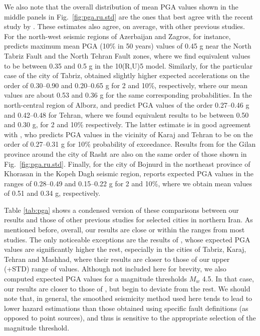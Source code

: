 We also note that the overall distribution of mean PGA values shown in the middle panels in Fig.~\ref{fig:pga.ru.std} are the ones that best agree with the recent study by \citet{Khodaverdian_2016_BSSA}. These estimates also agree, on average, with other previous studies. For the north-west seismic regions of Azerbaijan and Zagros, for instance, \citet{Tavakoli1999} predicts maximum mean PGA (10\% in 50 years) values of 0.45 g near the North Tabriz Fault and the North Tehran Fault zones, where we find equivalent values to be between 0.35 and 0.5 g in the 10(R,U)5 model. Similarly, for the particular case of the city of Tabriz, \citet{Vafaie2011} obtained slightly higher expected accelerations on the order of 0.30--0.90 and 0.20--0.65 g for 2 and 10\%, respectively, where our mean values are about 0.53 and 0.36 g for the same corresponding probabilities. In the north-central region of Alborz, \citet{Ghodrati2003} and \citet{Boostan2015} predict PGA values of the order 0.27--0.46 g and 0.42--0.48 for Tehran, where we found equivalent results to be between 0.50 and 0.30 g, for 2 and 10\% respectively. The latter estimate is in good agreement with \citet{Abdi2013}, who predicts PGA values in the vicinity of Karaj and Tehran to be on the order of 0.27--0.31 g for 10\% probability of exceedance. Results from \citet{Ghodrati2008} for the Gilan province around the city of Rasht are also on the same order of those shown in Fig.~\ref{fig:pga.ru.std}. Finally, for the city of Bojnurd in the northeast province of Khorasan in the Kopeh Dagh seismic region, \citet{Rahgozar2012} reports expected PGA values in the ranges of 0.28--0.49 and 0.15--0.22 g for 2 and 10\%, where we obtain mean values of 0.51 and 0.34 g, respectively.

Table \ref{tab:pga} shows a condensed version of these comparisons between our results and those of other previous studies for selected cities in northern Iran. As mentioned before, overall, our results are close or within the ranges from most studies. The only noticeable exceptions are the results of \citet{Golara2014}, whose expected PGA values are significantly higher the rest, especially in the cities of Tabriz, Karaj, Tehran and Mashhad, where their results are closer to those of our upper (+STD) range of values. Although not included here for brevity, we also computed expected PGA values for a magnitude thresholds $M_w$ 4.5. In that case, our results are closer to those of \citet{Golara2014}, but begin to deviate from the rest. We should note that, in general, the smoothed seismicity method used here tends to lead to lower hazard estimations than those obtained using specific fault definitions (as opposed to point sour\-ces), and thus is sensitive to the appropriate selection of the magnitude threshold.

